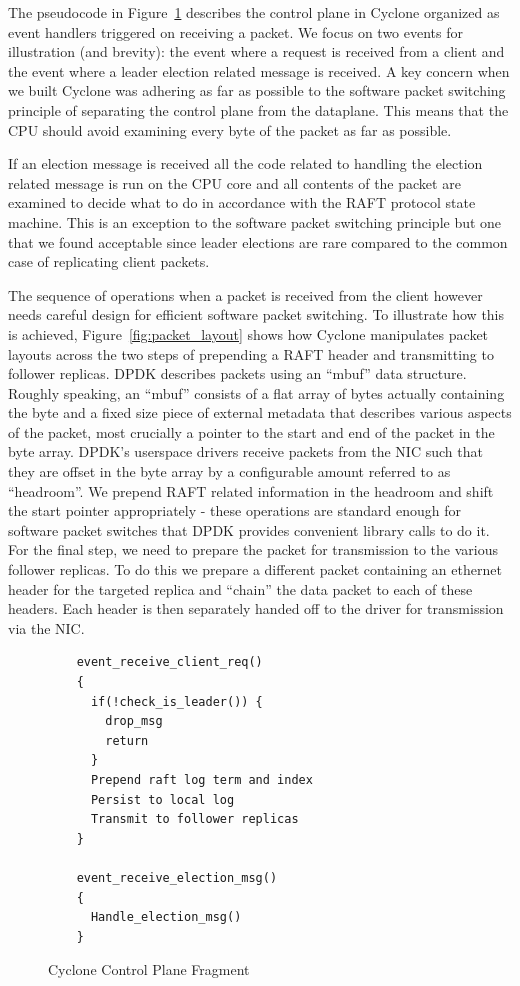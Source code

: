 \documentclass[10pt, preprint, nonatbib]{sigplanconf}
\begin{document}
The pseudocode in Figure~\ref{fig:control_plane} describes the control plane in
Cyclone organized as event handlers triggered on receiving a packet. We focus on
two events for illustration (and brevity): the event where a request is received
from a client and the event where a leader election related message is
received. A key concern when we built Cyclone was adhering as far as possible to
the software packet switching principle of separating the control plane from the
dataplane. This means that the CPU should avoid examining every byte of the
packet as far as possible.

If an election message is received all the code related to handling
the election related message is run on the CPU core and all contents of the
packet are examined to decide what to do in accordance with the RAFT protocol
state machine. This is an exception to the software packet switching principle
but one that we found acceptable since leader elections are rare compared to the
common case of replicating client packets.

The sequence of operations when a packet is received from the client however
needs careful design for efficient software packet switching. To illustrate how
this is achieved, Figure~\ref{fig:packet_layout} shows how Cyclone manipulates
packet layouts across the two steps of prepending a RAFT header and transmitting
to follower replicas. DPDK describes packets using an ``mbuf'' data
structure. Roughly speaking, an ``mbuf'' consists of a flat array of bytes
actually containing the byte and a fixed size piece of external metadata that
describes various aspects of the packet, most crucially a pointer to the start
and end of the packet in the byte array. DPDK's userspace drivers receive
packets from the NIC such that they are offset in the byte array by a
configurable amount referred to as ``headroom''. We prepend RAFT related
information in the headroom and shift the start pointer appropriately - these
operations are standard enough for software packet switches that DPDK provides
convenient library calls to do it. For the final step, we need to prepare the
packet for transmission to the various follower replicas. To do this we prepare
a different packet containing an ethernet header for the targeted replica and
``chain'' the data packet to each of these headers. Each header is then
separately handed off to the driver for transmission via the NIC.

\begin{figure}
\begin{verbatim}
    event_receive_client_req()
    {
      if(!check_is_leader()) {
        drop_msg
        return
      }
      Prepend raft log term and index
      Persist to local log
      Transmit to follower replicas
    }

    event_receive_election_msg()
    {
      Handle_election_msg()
    }
\end{verbatim}
\caption{Cyclone Control Plane Fragment}
\label{fig:control_plane}
\end{figure}
\end{document}
